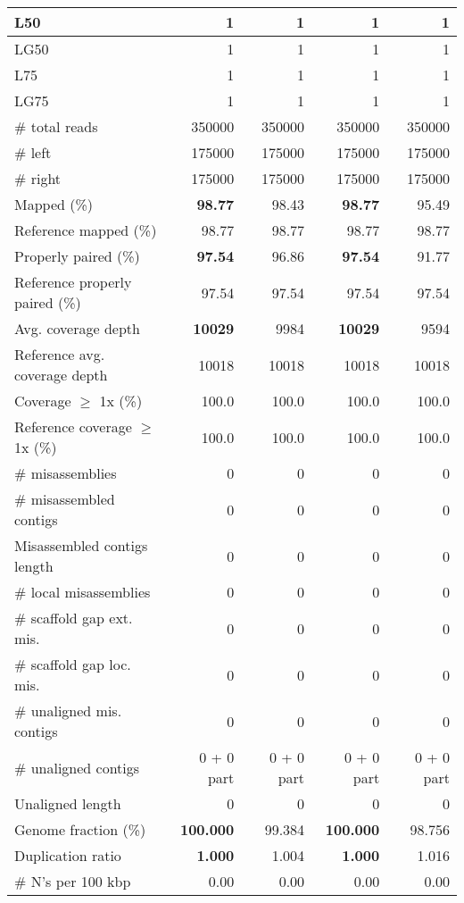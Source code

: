 \documentclass[12pt,a4paper]{article}
\begin{document}
\begin{table}[ht]
\begin{center}
\begin{tabular}{|l*{4}{|r}|}
L50 & 1 & 1 & 1 & 1 \\ \hline
LG50 & 1 & 1 & 1 & 1 \\ \hline
L75 & 1 & 1 & 1 & 1 \\ \hline
LG75 & 1 & 1 & 1 & 1 \\ \hline
\# total reads & 350000 & 350000 & 350000 & 350000 \\ \hline
\# left & 175000 & 175000 & 175000 & 175000 \\ \hline
\# right & 175000 & 175000 & 175000 & 175000 \\ \hline
Mapped (\%) & {\bf 98.77} & 98.43 & {\bf 98.77} & 95.49 \\ \hline
Reference mapped (\%) & 98.77 & 98.77 & 98.77 & 98.77 \\ \hline
Properly paired (\%) & {\bf 97.54} & 96.86 & {\bf 97.54} & 91.77 \\ \hline
Reference properly paired (\%) & 97.54 & 97.54 & 97.54 & 97.54 \\ \hline
Avg. coverage depth & {\bf 10029} & 9984 & {\bf 10029} & 9594 \\ \hline
Reference avg. coverage depth & 10018 & 10018 & 10018 & 10018 \\ \hline
Coverage $\geq$ 1x (\%) & 100.0 & 100.0 & 100.0 & 100.0 \\ \hline
Reference coverage $\geq$ 1x (\%) & 100.0 & 100.0 & 100.0 & 100.0 \\ \hline
\# misassemblies & 0 & 0 & 0 & 0 \\ \hline
\# misassembled contigs & 0 & 0 & 0 & 0 \\ \hline
Misassembled contigs length & 0 & 0 & 0 & 0 \\ \hline
\# local misassemblies & 0 & 0 & 0 & 0 \\ \hline
\# scaffold gap ext. mis. & 0 & 0 & 0 & 0 \\ \hline
\# scaffold gap loc. mis. & 0 & 0 & 0 & 0 \\ \hline
\# unaligned mis. contigs & 0 & 0 & 0 & 0 \\ \hline
\# unaligned contigs & 0 + 0 part & 0 + 0 part & 0 + 0 part & 0 + 0 part \\ \hline
Unaligned length & 0 & 0 & 0 & 0 \\ \hline
Genome fraction (\%) & {\bf 100.000} & 99.384 & {\bf 100.000} & 98.756 \\ \hline
Duplication ratio & {\bf 1.000} & 1.004 & {\bf 1.000} & 1.016 \\ \hline
\# N's per 100 kbp & 0.00 & 0.00 & 0.00 & 0.00 \\ \hline

\end{tabular}
\end{center}
\end{table}
\end{document}
